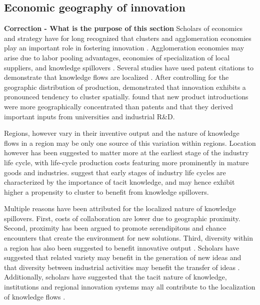 \documentclass[12pt,letterpaper]{article}
\begin{document}
\subsection{Economic geography of innovation}
\textbf{Correction - What is the purpose of this section}
Scholars of economics and strategy have for long recognized that clusters and agglomeration economies play an important role in fostering innovation \citep{Marshall1890, Porter1990}. Agglomeration economies may arise due to labor pooling advantages, economies of specialization of local suppliers, and knowledge spillovers \citep{Porter1990, Krugman1991a}.  Several studies have used patent citations to demonstrate that knowledge flows are localized \citep*{Jaffe1993, Almeida1999}. After controlling for the geographic distribution of production, \cite{Audretsch1996a} demonstrated that innovation exhibits a pronounced tendency to cluster spatially. \cite*{Acs1994} found that new product introductions were more geographically concentrated than patents and that they derived important inputs from universities and industrial R\&D. \par

Regions, however vary in their inventive output \citep*{Agrawal2014b} and the nature of knowledge flows in a region may be only one source of this variation within regions. Location however has been suggested to matter more at the earliest stage of the industry life cycle, with life-cycle production costs featuring more prominently in mature goods and industries. \cite{Audretsch1996b} suggest that early stages of  industry life cycles are characterized by the importance of tacit knowledge, and may hence exhibit higher a propensity to cluster to benefit from knowledge spillovers. \par

Multiple reasons have been attributed for the localized nature of knowledge spillovers. First, costs of collaboration are lower due to geographic proximity. Second, proximity has been argued to promote serendipitous and chance encounters that create the environment for new solutions. Third, diversity within a region has also been suggested to benefit innovative output \citep{Feldman1999}. Scholars have suggested that related variety \citep*{Boschma2009, Frenken2007} may benefit in the generation of new ideas and that diversity between industrial activities may benefit the transfer of ideas \citep{Jacobs1969}. Additionally, scholars have suggested that the tacit nature of knowledge, institutions and regional innovation systems may all contribute to the localization of knowledge flows  \citep{Cooke1996, Maskell1999, Howells1996, Howells2002}.
\end{document}

